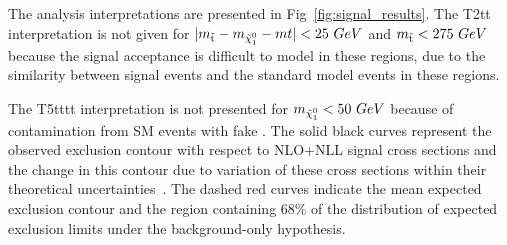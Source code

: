 The analysis interpretations are presented in Fig~\ref{fig:signal_results}. The T2tt interpretation is not given for $|m_{\tilde{{\mathrm t}}}-m_{\tilde{\chi}^{0}_{1}}-m{t}|<25~GeV$ and $m_{\tilde{{\mathrm t}}}<275~GeV$ because the signal acceptance is difficult to model in these regions, due to the similarity between signal events and the standard model \ttbar events in these regions. 

The T5tttt interpretation is not presented for $m_{\tilde{\chi}^{0}_{1}}<50~GeV$ because of contamination from SM \ttbar events with fake \MET.
The solid black curves represent the observed exclusion contour with respect to NLO+NLL signal cross sections and the change in this contour due to variation of these cross sections within their theoretical uncertainties~\cite{Borschensky:2014cia}. The dashed red curves indicate the mean expected exclusion contour and the region containing 68\% of the distribution of expected exclusion limits under the background-only hypothesis. 

